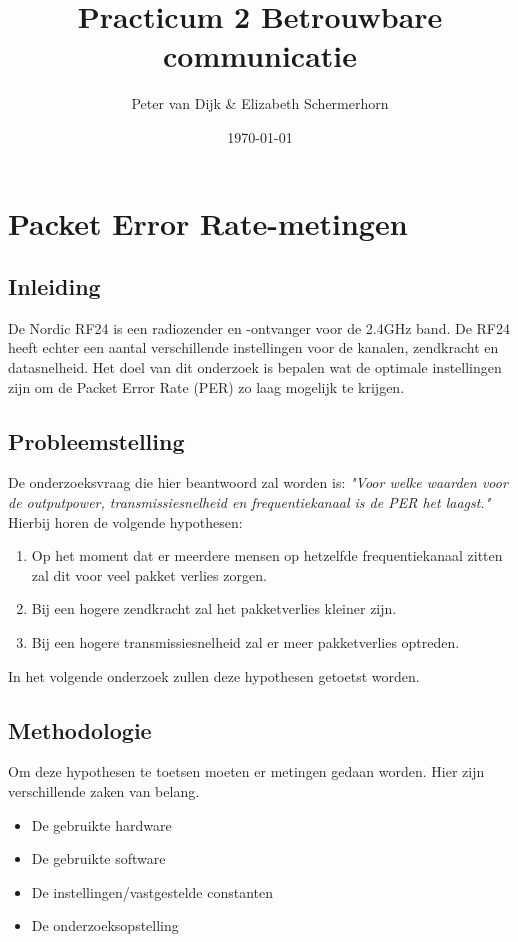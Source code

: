 \documentclass{article}
\author{Peter van Dijk \& Elizabeth Schermerhorn}
\date{\today}
\title{Practicum 2 Betrouwbare communicatie}
\begin{document}
\maketitle
\newpage
\tableofcontents
\clearpage
\section{Packet Error Rate-metingen}
\subsection{Inleiding}
De Nordic RF24 is een radiozender en -ontvanger voor de 2.4GHz band. De RF24 heeft echter een aantal verschillende instellingen voor de kanalen, zendkracht en datasnelheid. Het doel van dit onderzoek is bepalen wat de optimale instellingen zijn om de Packet Error Rate (PER) zo laag mogelijk te krijgen.

\subsection{Probleemstelling}
De onderzoeksvraag die hier beantwoord zal worden is: \textit{"Voor welke waarden voor de outputpower, transmissiesnelheid en frequentiekanaal is de PER het laagst."} Hierbij horen de volgende hypothesen: 
\begin{enumerate}
  \item Op het moment dat er meerdere mensen op hetzelfde frequentiekanaal zitten zal dit voor veel pakket verlies zorgen.
  \item Bij een hogere zendkracht zal het pakketverlies kleiner zijn.
  \item Bij een hogere transmissiesnelheid zal er meer pakketverlies optreden. 
\end{enumerate}
In het volgende onderzoek zullen deze hypothesen getoetst worden.
\subsection{Methodologie}
Om deze hypothesen te toetsen moeten er metingen gedaan worden. Hier zijn verschillende zaken van belang. 
\begin{itemize}
	\item De gebruikte hardware
	\item De gebruikte software
	\item De instellingen/vastgestelde constanten
	\item De onderzoeksopstelling
\end{itemize}
\end{document}
